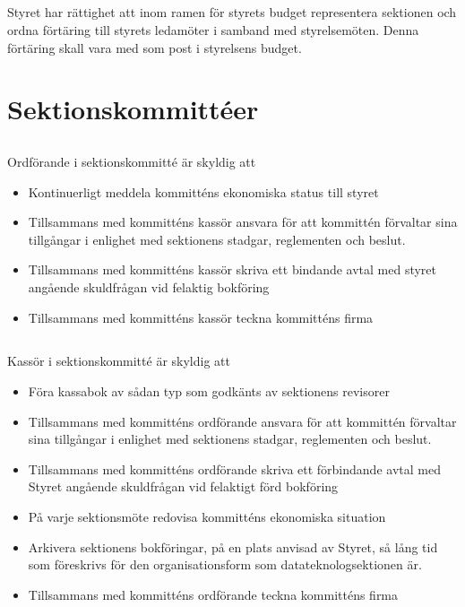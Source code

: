 \documentclass[a4paper, 10pt]{article}
\begin{document}
\subsection{}
Styret har rättighet att inom ramen för styrets budget representera sektionen och ordna förtäring till styrets ledamöter i samband med styrelsemöten. Denna förtäring skall vara med som post i styrelsens budget.

\section{Sektionskommittéer}
\label{sec:sektionsforeningar}
\subsection{}
Ordförande i sektionskommitté är skyldig att
\begin{itemize}
\item Kontinuerligt meddela kommitténs ekonomiska status till styret
\item Tillsammans med kommitténs kassör ansvara för att kommittén förvaltar sina tillgångar i enlighet med sektionens stadgar, reglementen och beslut.
\item Tillsammans med kommitténs kassör skriva ett bindande avtal med
styret angående skuldfrågan vid felaktig bokföring
\item Tillsammans med kommitténs kassör teckna kommitténs firma
\end{itemize}
\subsection{}
Kassör i sektionskommitté är skyldig att
\begin{itemize}
\item Föra kassabok av sådan typ som godkänts av sektionens revisorer
\item Tillsammans med kommitténs ordförande ansvara för att kommittén förvaltar sina tillgångar i enlighet med sektionens stadgar, reglementen och beslut.
\item Tillsammans med kommitténs ordförande skriva ett förbindande avtal med Styret angående skuldfrågan vid felaktigt förd bokföring
\item På varje sektionsmöte redovisa kommitténs ekonomiska situation
\item Arkivera sektionens bokföringar, på en plats anvisad av Styret, så lång tid som föreskrivs för den organisationsform som datateknologsektionen är.
\item Tillsammans med kommitténs ordförande teckna kommitténs firma
\end{itemize}
\end{document}

